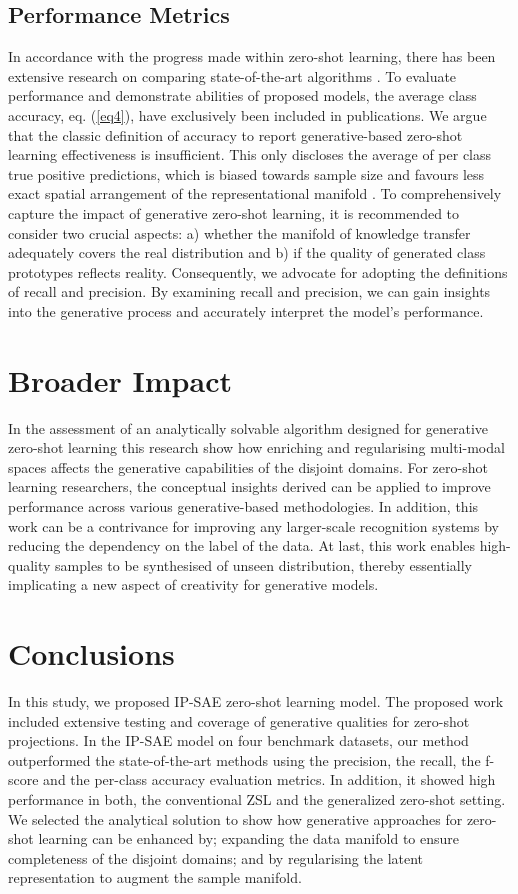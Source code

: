 \documentclass{article}
\begin{document}
\subsection{Performance Metrics}
In accordance with the progress made within zero-shot learning, there has been extensive research on comparing state-of-the-art algorithms \cite{b56, b63}. To evaluate performance and demonstrate abilities of proposed models, the average class accuracy, eq. (\ref{eq4}), have exclusively been included in publications. We argue that the classic definition of accuracy to report generative-based zero-shot learning effectiveness is insufficient. This only discloses the average of per class true positive predictions, which is biased towards sample size and favours less exact spatial arrangement of the representational manifold \cite{b76}. To comprehensively capture the impact of generative zero-shot learning, it is recommended to consider two crucial aspects: a) whether the manifold of knowledge transfer adequately covers the real distribution and b) if the quality of generated class prototypes reflects reality. Consequently, we advocate for adopting the definitions of recall and precision. By examining recall and precision, we can gain insights into the generative process and accurately interpret the model's performance.

\section{Broader Impact}
In the assessment of an analytically solvable algorithm designed for generative zero-shot learning this research show how enriching and regularising multi-modal spaces affects the generative capabilities of the disjoint domains. For zero-shot learning researchers, the conceptual insights derived can be applied to improve performance across various generative-based methodologies. In addition, this work can be a contrivance for improving any larger-scale recognition systems by reducing the dependency on the label of the data. At last, this work enables high-quality samples to be synthesised of unseen distribution, thereby essentially implicating a new aspect of creativity for generative models.

\section{Conclusions}
\label{conc}
In this study, we proposed IP-SAE zero-shot learning model. The proposed work included extensive testing and coverage of generative qualities for zero-shot projections. In the IP-SAE model on four benchmark datasets, our method outperformed the state-of-the-art methods using the precision, the recall, the f-score and the per-class accuracy evaluation metrics. In addition, it showed high performance in both, the conventional ZSL and the generalized zero-shot setting. We selected the analytical solution to show how generative approaches for zero-shot learning can be enhanced by; expanding the data manifold to ensure completeness of the disjoint domains; and by regularising the latent representation to augment the sample manifold.
\end{document}
